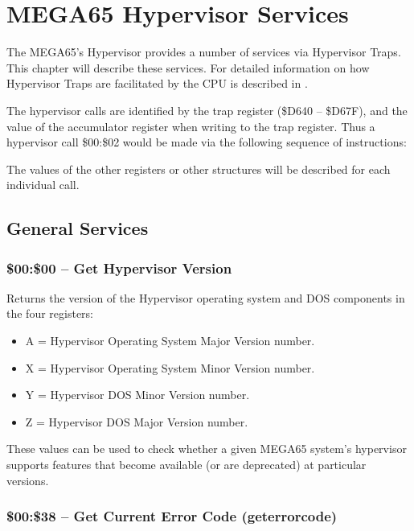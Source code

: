 \chapter{MEGA65 Hypervisor Services}

The MEGA65's Hypervisor provides a number of services via Hypervisor Traps.
This chapter will describe these services.  For detailed information on how
Hypervisor Traps are facilitated by the CPU is described in .

The hypervisor calls are identified by the trap register (\$D640 -- \$D67F), and
the value of the accumulator register when writing to the trap register.  Thus
a hypervisor call \$00:\$02 would be made via the following sequence of instructions:


The values of the other registers or other structures will be described for
each individual call.

\section{General Services}

\subsection{\$00:\$00 -- Get Hypervisor Version}

Returns the version of the Hypervisor operating system and DOS components in the
four registers:

\begin{itemize}
  \item A = Hypervisor Operating System Major Version number. 
  \item X = Hypervisor Operating System Minor Version number. 
  \item Y = Hypervisor DOS Minor Version number. 
  \item Z = Hypervisor DOS Major Version number. 
\end{itemize}

These values can be used to check whether a given MEGA65 system's hypervisor
supports features that become available (or are deprecated) at particular versions.

\subsection{\$00:\$38 -- Get Current Error Code (geterrorcode)}


